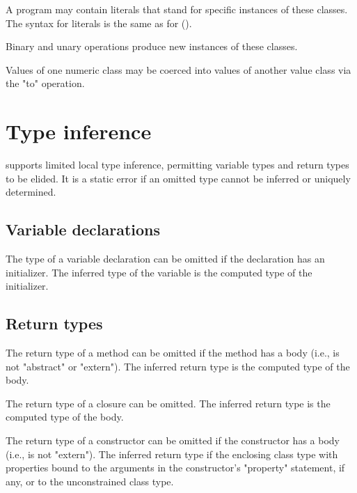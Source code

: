 A program may contain literals
that stand for specific instances of these classes. The syntax
for literals is the same as for \java{} ().

Binary and unary operations produce new instances of these
classes.

Values of one numeric class may be coerced into values of
another value class via the \xcd"to" operation.





\section{Type inference}
\label{TypeInference}

\XtenCurrVer{} supports limited local type inference, permitting
variable types and return types to be elided.
It is a static error if an omitted type cannot be inferred or
uniquely determined.

\subsection{Variable declarations}

The type of a variable declaration can be omitted if the
declaration has an initializer.  The inferred type of the
variable is the computed type of the initializer.

\subsection{Return types}

The return type of a method can be omitted if the method has a
body (i.e., is not \xcd"abstract" or \xcd"extern").  The
inferred return type is the computed type of the body.

The return type of a closure can be omitted.
The inferred return type is the computed type of the body.

The return type of a constructor can be omitted if the
constructor has a body (i.e., is not \xcd"extern").
The inferred return type if the enclosing class type with
properties bound to the arguments in the constructor's \xcd"property"
statement, if any, or to the unconstrained class type.

